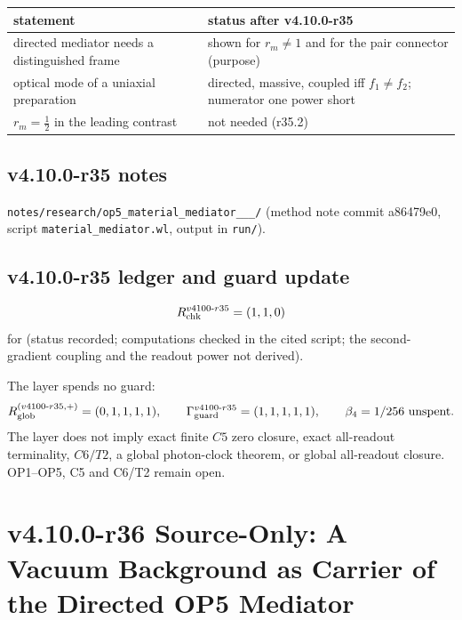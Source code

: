 \begin{center}
\small
\begin{tabular}{@{}>{\raggedright\arraybackslash}p{}>{\raggedright\arraybackslash}p{}@{}}
\toprule
statement & status after v4.10.0-r35\\
\midrule
directed mediator needs a distinguished frame & shown for \(r_m\neq1\) and for the pair connector (purpose)\\
optical mode of a uniaxial preparation & directed, massive, coupled iff \(f_1\neq f_2\); numerator one power short\\
\(r_m=\tfrac12\) in the leading contrast & not needed (r35.2)\\
\bottomrule
\end{tabular}
\end{center}

\subsection*{v4.10.0-r35 notes}
\label{subsec:v4100-r35-notes}

\texttt{notes/\allowbreak research/\allowbreak op5\_\allowbreak material\_\allowbreak mediator\_\_\_/} (method note commit a86479e0,
script \texttt{material\_\allowbreak mediator.wl}, output in \texttt{run/}).

\subsection*{v4.10.0-r35 ledger and guard update}
\label{subsec:v4100-r35-ledger-guard}

\[
R_{\rm chk}^{v4100\text{-}r35}=(1,1,0)
\]
for (status recorded; computations checked in the cited script; the second-gradient coupling and the readout power not derived).

The layer spends no guard:
\[
R_{\rm glob}^{(v4100\text{-}r35,+)}=(0,1,1,1,1),
\qquad
\Gamma_{\rm guard}^{v4100\text{-}r35}=(1,1,1,1,1),
\qquad
\beta_4=1/256\ \text{unspent}.
\]
The layer does not imply exact finite \(C5\) zero closure, exact all-readout terminality, \(C6/T2\), a global photon-clock theorem,
or global all-readout closure.  OP1--OP5, C5 and C6/T2 remain open.

\clearpage
\section*{v4.10.0-r36 Source-Only: A Vacuum Background as Carrier of the Directed OP5 Mediator}
\label{sec:v4100-r36-background-mediator}

